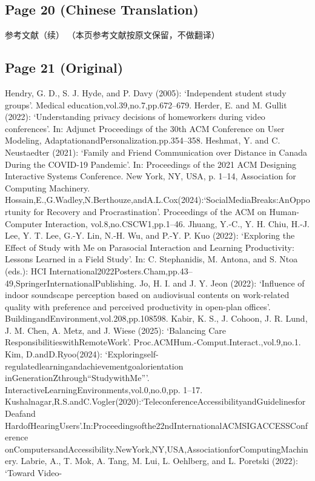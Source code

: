 \documentclass[12pt]{ctexart}
\begin{document}
\subsection*{Page 20 (Chinese Translation)}

参考文献（续）
（本页参考文献按原文保留，不做翻译）

\subsection*{Page 21 (Original)}

Hendry, G. D., S. J. Hyde, and P. Davy (2005): ‘Independent student study groups’. Medical
education,vol.39,no.7,pp.672–679.
Herder, E. and M. Gullit (2022): ‘Understanding privacy decisions of homeworkers during video
conferences’. In: Adjunct Proceedings of the 30th ACM Conference on User Modeling,
AdaptationandPersonalization.pp.354–358.
Heshmat, Y. and C. Neustaedter (2021): ‘Family and Friend Communication over Distance in
Canada During the COVID-19 Pandemic’. In: Proceedings of the 2021 ACM Designing
Interactive Systems Conference. New York, NY, USA, p. 1–14, Association for Computing
Machinery.
Hossain,E.,G.Wadley,N.Berthouze,andA.L.Cox(2024):‘SocialMediaBreaks:AnOpportunity
for Recovery and Procrastination’. Proceedings of the ACM on Human-Computer Interaction,
vol.8,no.CSCW1,pp.1–46.
Jhuang, Y.-C., Y. H. Chiu, H.-J. Lee, Y. T. Lee, G.-Y. Lin, N.-H. Wu, and P.-Y. P. Kuo (2022):
‘Exploring the Effect of Study with Me on Parasocial Interaction and Learning Productivity:
Lessons Learned in a Field Study’. In: C. Stephanidis, M. Antona, and S. Ntoa (eds.): HCI
International2022Posters.Cham,pp.43–49,SpringerInternationalPublishing.
Jo, H. I. and J. Y. Jeon (2022): ‘Influence of indoor soundscape perception based on audiovisual
contents on work-related quality with preference and perceived productivity in open-plan
offices’. BuildingandEnvironment,vol.208,pp.108598.
Kabir, K. S., J. Cohoon, J. R. Lund, J. M. Chen, A. Metz, and J. Wiese (2025): ‘Balancing Care
ResponsibilitieswithRemoteWork’. Proc.ACMHum.-Comput.Interact.,vol.9,no.1.
Kim, D.andD.Ryoo(2024): ‘Exploringself-regulatedlearningandachievementgoalorientation
inGenerationZthrough“StudywithMe”’. InteractiveLearningEnvironments,vol.0,no.0,pp.
1–17.
Kushalnagar,R.S.andC.Vogler(2020):‘TeleconferenceAccessibilityandGuidelinesforDeafand
HardofHearingUsers’.In:Proceedingsofthe22ndInternationalACMSIGACCESSConference
onComputersandAccessibility.NewYork,NY,USA,AssociationforComputingMachinery.
Labrie, A., T. Mok, A. Tang, M. Lui, L. Oehlberg, and L. Poretski (2022): ‘Toward Video-
\end{document}
